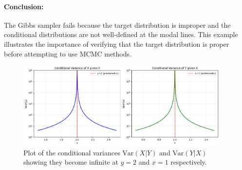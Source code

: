 \paragraph{Conclusion:}
The Gibbs sampler fails because the target distribution is improper and the conditional distributions are not well-defined at the modal lines. This example illustrates the importance of verifying that the target distribution is proper before attempting to use MCMC methods.

\begin{figure}[h!]
    \centering
    \includegraphics[width=0.95\textwidth]{exercise1_conditional_variances.png}
    \caption{Plot of the conditional variances $\text{Var}(X|Y)$ and $\text{Var}(Y|X)$ showing they become infinite at $y=2$ and $x=1$ respectively.}
    \label{fig:exercise1}
\end{figure}    